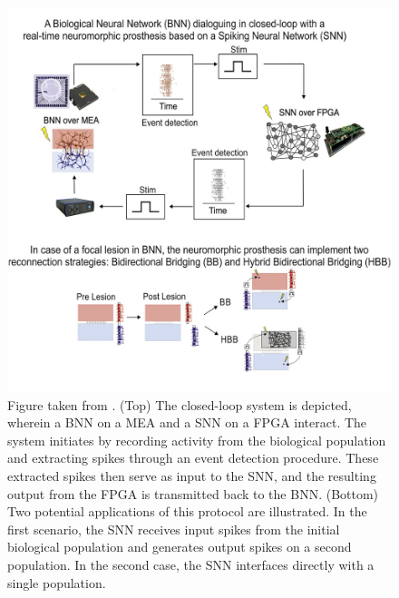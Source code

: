 \begin{figure}[hbt!]
    \begin{center}
    \includegraphics[width=0.9\linewidth]{img/BNN-SNN.jpg}
    \end{center}
    \caption[Biohybrid System]{Figure taken from \cite{BUCCELLI}. (Top) The closed-loop system is depicted, wherein a BNN on a MEA and a SNN on a FPGA interact. The system initiates by recording activity from the biological population and extracting spikes through an event detection procedure. These extracted spikes then serve as input to the SNN, and the resulting output from the FPGA is transmitted back to the BNN. (Bottom) Two potential applications of this protocol are illustrated. In the first scenario, the SNN receives input spikes from the initial biological population and generates output spikes on a second population. In the second case, the SNN interfaces directly with a single population.}
    \label{fig:closedloop}
\end{figure}

